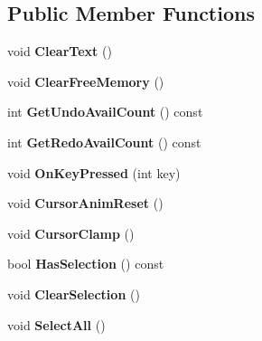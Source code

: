 \subsection*{Public Member Functions}
\begin{DoxyCompactItemize}
\item 
\mbox{\label{structImGuiInputTextState_a451153353e47a2aee5ca6c4b362fe2c1}} 
void {\bfseries Clear\+Text} ()
\item 
\mbox{\label{structImGuiInputTextState_a8be5f345ea5de89842d5a6716cb19b27}} 
void {\bfseries Clear\+Free\+Memory} ()
\item 
\mbox{\label{structImGuiInputTextState_a466373ea612d3b3d2fe1449193850d5f}} 
int {\bfseries Get\+Undo\+Avail\+Count} () const
\item 
\mbox{\label{structImGuiInputTextState_a96f6741c8556dbfe9c92f28faee063e3}} 
int {\bfseries Get\+Redo\+Avail\+Count} () const
\item 
\mbox{\label{structImGuiInputTextState_a2cd5083f820d0012479bb706a45b04b0}} 
void {\bfseries On\+Key\+Pressed} (int key)
\item 
\mbox{\label{structImGuiInputTextState_a78a05f36dbfd38b9026a4980a15a6a3e}} 
void {\bfseries Cursor\+Anim\+Reset} ()
\item 
\mbox{\label{structImGuiInputTextState_a0924f1eead76c7d58090aa603cea4301}} 
void {\bfseries Cursor\+Clamp} ()
\item 
\mbox{\label{structImGuiInputTextState_ab17832413ff121a5663319c06bbb989a}} 
bool {\bfseries Has\+Selection} () const
\item 
\mbox{\label{structImGuiInputTextState_aa834c6b6c9f3d589b55eb22ca9a01c3e}} 
void {\bfseries Clear\+Selection} ()
\item 
\mbox{\label{structImGuiInputTextState_ac9ceb16a3551dc82a1e8be716236b811}} 
void {\bfseries Select\+All} ()
\end{DoxyCompactItemize}
